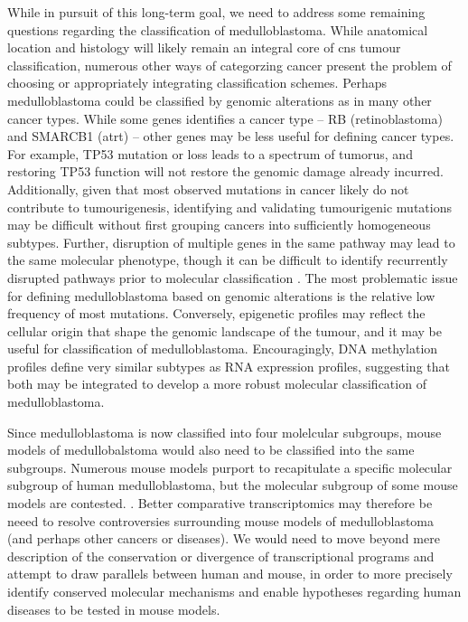 While in pursuit of this long-term goal, we need to address some remaining questions regarding the classification of medulloblastoma. While anatomical location and histology will likely remain an integral core of \gls{cns} tumour classification, numerous other ways of categorzing cancer present the problem of choosing or appropriately integrating classification schemes. Perhaps medulloblastoma could be classified by genomic alterations as in many other cancer types. While some genes identifies a cancer type -- RB (retinoblastoma) and SMARCB1 (\gls{atrt}) -- other genes may be less useful for defining cancer types. For example, TP53 mutation or loss leads to a spectrum of tumorus, and restoring TP53 function will not restore the genomic damage already incurred. Additionally, given that most observed mutations in cancer likely do not contribute to tumourigenesis, identifying and validating tumourigenic mutations may be difficult without first grouping cancers into sufficiently homogeneous subtypes. Further, disruption of multiple genes in the same pathway may lead to the same molecular phenotype, though it can be difficult to identify recurrently disrupted pathways prior to molecular classification . The most problematic issue for defining medulloblastoma based on genomic alterations is the relative low frequency of most mutations.  Conversely, epigenetic profiles may reflect the cellular origin that shape the genomic landscape of the tumour, and it may be useful for classification of medulloblastoma. Encouragingly, DNA methylation profiles define very similar subtypes as RNA expression profiles, suggesting that both may be integrated to develop a more robust molecular classification of medulloblastoma.

Since medulloblastoma is now classified into four molelcular subgroups, mouse models of medullobalstoma would also need to be classified into the same subgroups. Numerous mouse models purport to recapitulate a specific molecular subgroup of human medulloblastoma,  but the molecular subgroup of some mouse models are contested. . Better comparative transcriptomics may therefore be neeed to resolve controversies surrounding mouse models of medulloblastoma (and perhaps other cancers or diseases). We would need to move beyond mere description of the conservation or divergence of transcriptional programs and  attempt to draw parallels between human and mouse, in order to more precisely identify conserved molecular mechanisms and enable hypotheses regarding human diseases to be tested in mouse models.

